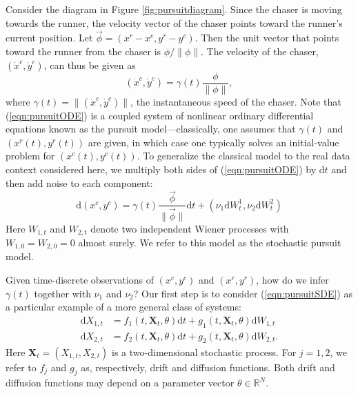\documentclass[graybox]{svmult}
\begin{document}
Consider the diagram in Figure \ref{fig:pursuitdiagram}.  Since the
chaser is moving towards the runner, the velocity vector of the chaser
points toward the runner's current position.  Let $\vec{\phi} = (x^{r}
- x^{c}, y^{r} - y^{c})$. Then the unit vector that points toward the
runner from the chaser is $\phi / \| \phi \|$.  The velocity of the chaser, $(\dot{x}^c, \dot{y}^c)$, can thus be given as
\begin{equation}
\label{eqn:pursuitODE}
(\dot{x}^c, \dot{y}^c) = \gamma(t) \frac{\phi}{\| \phi \|},
\end{equation}
where $\gamma(t) = \| (\dot{x}^c,\dot{y}^c) \|$, the instantaneous
speed of the chaser.  Note that (\ref{eqn:pursuitODE}) is a coupled
system of nonlinear ordinary differential equations known as the
pursuit model---classically, one assumes that
$\gamma(t)$ and $(x^{r}(t),y^{r}(t))$ are given, in which case one
typically solves an initial-value problem for $(x^{c}(t),y^{c}(t))$.
To generalize the classical model to the real data context considered
here, we multiply both sides of (\ref{eqn:pursuitODE}) by $\mathrm{d}t$ and
then add noise to each component:
\begin{equation}
\label{eqn:pursuitSDE}
\mathrm{d}(x^{c}, y^{c}) = \gamma(t) \frac{\vec{\phi}}{ \|
                           \vec{\phi} \| } \mathrm{d}t + (\nu_1
                         \mathrm{d}W^1_t, \nu_2 \mathrm{d}W^2_t)
\end{equation}
Here $W_{1,t}$ and $W_{2,t}$ denote two independent Wiener processes
with $W_{1,0} = W_{2,0} = 0$ almost surely.  We refer to this model as
the stochastic pursuit model.

Given time-discrete observations of
$(x^{c},y^{c})$ and $(x^{r},y^{r})$, how do we infer $\gamma(t)$
together with $\nu_1$ and $\nu_2$?  Our first step is to consider
(\ref{eqn:pursuitSDE}) as a particular example of a more general class of systems:
\begin{subequations}
\label{eqn:sde}
\begin{align}
\mathrm{d}X_{1,t} &= f_1(t, \mathbf{X}_t, \theta)\mathrm{d}t + g_1(t, \mathbf{X}_t, \theta) \mathrm{d}W_{1,t} \\
\mathrm{d}X_{2,t} &= f_2(t, \mathbf{X}_t, \theta)\mathrm{d}t + g_2(t, \mathbf{X}_t, \theta) \mathrm{d}W_{2,t}.
\end{align}
\end{subequations}
Here $\mathbf{X}_t = (X_{1,t}, X_{2,t})$ is a two-dimensional
stochastic process. For $j=1, 2$, we refer to $f_j$ and $g_j$ as,
respectively, drift and diffusion functions.  Both
drift and diffusion functions may depend on a parameter vector
$\theta \in \mathbb{R}^{N}$.
\end{document}
